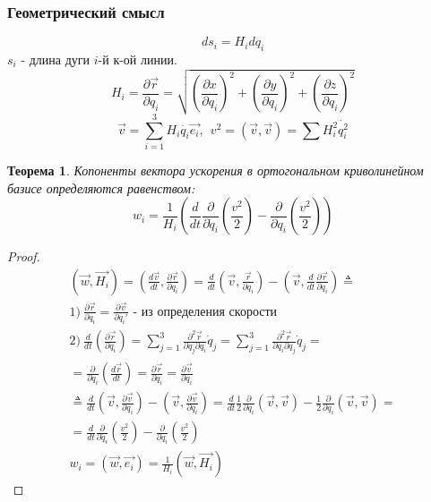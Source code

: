 \documentclass{article}
\renewcommand{\v}[1]{{\vec{#1}}}
\newtheorem{teo}{Теорема}
\begin{document}
  \subsubsection{Геометрический смысл}
  $$ ds_i = H_i dq_i $$
  $s_i$ - длина дуги $i$-й к-ой линии.
  $$ H_i = \frac{\partial \v{r}}{\partial q_i}  = \sqrt{\left(\frac{\partial x}{\partial q_i}\right) ^2 + \left(\frac{\partial y}{\partial q_i}\right) ^2 + \left(\frac{\partial z}{\partial q_i}\right) ^2} $$
  $$ \v{v} = \sum\limits_{i=1}^3 H_i \dot{q_i} \v{e_i},~~ v^2 = (\v{v}, \v{v}) = \sum H_i^2\dot{q_i^2} $$ 
  \begin{teo}
  Копоненты вектора ускорения в ортогональном криволинейном базисе определяются равенством:
  $$ w_i = \frac{1}{H_i}\left(\frac{d}{dt} \frac{\partial}{\partial \dot q_i} \left(\frac{v^2}{2}\right) - \frac{\partial}{\partial q_i} \left(\frac{v^2}{2} \right) \right) $$
  \end{teo}
  \begin{proof}
  \begin{gather}
(\v{w}, \v{H_i}) = \left(\frac{d\v{v}}{dt}, \frac{\partial \v{r}}{\partial q_i} \right) = \frac{d}{dt} \left(\v{v}, \frac{\v{r}}{\partial q_i}\right) - \left(\v{v}, \frac{d}{dt} \frac{\partial \v{r}}{\partial q_i} \right) \triangleq \\
1) ~ \frac{\partial \v{r}}{\partial q_i} = \frac{\partial \v{v}}{\partial q_i'} \text{ - из определения скорости} \\
2) ~ \frac{d}{dt} \left(\frac{\partial \v{r}}{\partial q_i} \right) = \sum \limits_{j = 1}^3 \frac{\partial^2 \v{r}}{\partial q_j \partial q_i} \dot q_j = \sum \limits_{j = 1}^3 \frac{\partial^2 \v{r}}{\partial q_i \partial q_j} \dot q_j = \\ 
= \frac{\partial}{\partial q_i} \left( \frac{d\v{r}}{dt} \right) = \frac{\partial \dot{\vec r}}{\partial q_i} = \frac{\partial \v{v}}{\partial q_i} \\
\triangleq \frac{d}{dt} \left(\v{v}, \frac{\partial \v{v}}{\partial q_i} \right) - \left( \v{v}, \frac{\partial \v{v}}{\partial q_i} \right) = \frac{d}{dt} \frac{1}{2} \frac{\partial}{\partial q_i} (\v{v}, \v{v}) - \frac{1}{2} \frac{\partial}{\partial q_i} (\v{v}, \v{v}) = \\ 
= \frac{d}{dt} \frac{\partial}{\partial \dot q_i} \left(\frac{v^2}{2} \right) - \frac{\partial}{\partial q_i} \left(\frac{v^2}{2}\right) \\
w_i = (\v{w}, \v{e_i}) = \frac{1}{H_i}(\v{w}, \v{H_i})
  \end{gather}
  \end{proof}
  
\end{document}
